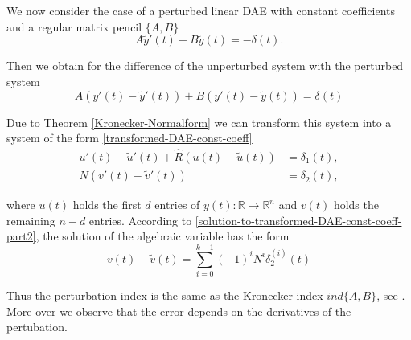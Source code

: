 We now consider the case of a perturbed linear DAE with constant coefficients and a regular matrix pencil $\{A,B\}$
\begin{displaymath}
	A \tilde{y}'(t) + B \tilde{y}(t) = -\delta(t).
\end{displaymath}

Then we obtain for the difference of the unperturbed system with the perturbed system 
\begin{displaymath}
	A(y'(t)-\tilde{y}'(t)) + B(y'(t)-\tilde{y}(t)) = \delta(t)
\end{displaymath}

Due to Theorem \ref{Kronecker-Normalform} we can transform this system into a system of the form \eqref{transformed-DAE-const-coeff} %
\begin{align*}
	u'(t) - \tilde{u}'(t) + \hat{R} (u(t) - \tilde{u}(t) ) &= \delta_1(t), \\
	N(v'(t) - \tilde{v}'(t)) &= \delta_2(t),
\end{align*}

where $u(t)$ holds the first $d$ entries of $y(t):\mathbb{R} \to \mathbb{R}^n$ and $v(t)$ holds the remaining $n-d$ entries. According to \eqref{solution-to-transformed-DAE-const-coeff-part2}, the solution of the algebraic variable has the form
\begin{displaymath}
	v(t) - \tilde{v}(t) = \sum_{i=0}^{k-1} (-1)^iN^i \delta_2^{(i)}(t) 
\end{displaymath}

Thus the perturbation index is the same as the Kronecker-index $ind\{A,B\}$, see \cite{NumerikGewöhnlicherDifferentialgleichungen}. More over we observe that the error depends on the derivatives of the pertubation.



